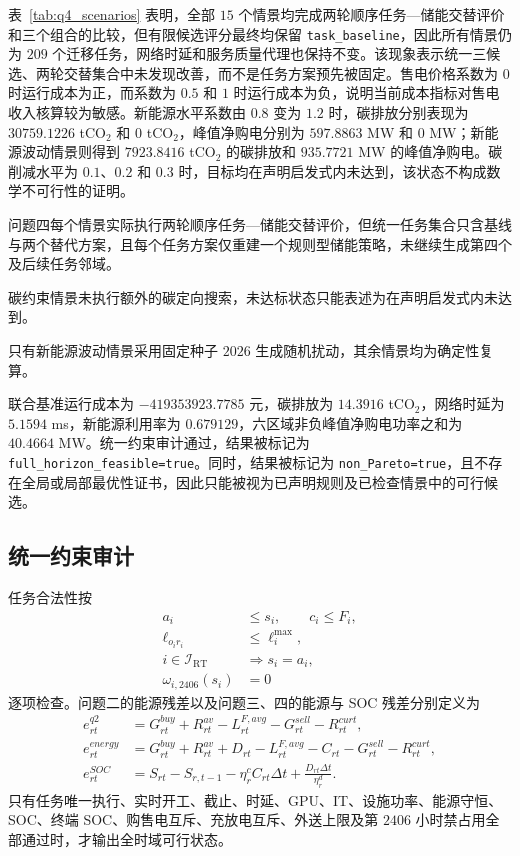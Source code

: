 表~\ref{tab:q4_scenarios} 表明，全部 $15$ 个情景均完成两轮顺序任务—储能交替评价和三个组合的比较，但有限候选评分最终均保留 \texttt{task\_baseline}，因此所有情景仍为 $209$ 个迁移任务，网络时延和服务质量代理也保持不变。该现象表示统一三候选、两轮交替集合中未发现改善，而不是任务方案预先被固定。售电价格系数为 $0$ 时运行成本为正，而系数为 $0.5$ 和 $1$ 时运行成本为负，说明当前成本指标对售电收入核算较为敏感。新能源水平系数由 $0.8$ 变为 $1.2$ 时，碳排放分别表现为 $30759.1226$ tCO$_2$ 和 $0$ tCO$_2$，峰值净购电分别为 $597.8863$ MW 和 $0$ MW；新能源波动情景则得到 $7923.8416$ tCO$_2$ 的碳排放和 $935.7721$ MW 的峰值净购电。碳削减水平为 $0.1$、$0.2$ 和 $0.3$ 时，目标均在声明启发式内未达到，该状态不构成数学不可行性的证明。

问题四每个情景实际执行两轮顺序任务—储能交替评价，但统一任务集合只含基线与两个替代方案，且每个任务方案仅重建一个规则型储能策略，未继续生成第四个及后续任务邻域。

碳约束情景未执行额外的碳定向搜索，未达标状态只能表述为在声明启发式内未达到。

只有新能源波动情景采用固定种子 $2026$ 生成随机扰动，其余情景均为确定性复算。

联合基准运行成本为 $-419353923.7785$ 元，碳排放为 $14.3916$ tCO$_2$，网络时延为 $5.1594$ ms，新能源利用率为 $0.679129$，六区域非负峰值净购电功率之和为 $40.4664$ MW。统一约束审计通过，结果被标记为 \texttt{full\_horizon\_feasible=true}。同时，结果被标记为 \texttt{non\_Pareto=true}，且不存在全局或局部最优性证书，因此只能被视为已声明规则及已检查情景中的可行候选。

\subsection{统一约束审计}

任务合法性按
\begin{align}
a_i&\le s_i,\qquad c_i\le F_i,\\
\ell_{o_ir_i}&\le\ell_i^{\max},\\
i\in\mathcal I_{\mathrm{RT}}&\Rightarrow s_i=a_i,\\
\omega_{i,2406}(s_i)&=0
\end{align}
逐项检查。问题二的能源残差以及问题三、四的能源与 SOC 残差分别定义为
\begin{align}
e_{rt}^{q2}
&=G_{rt}^{buy}+R_{rt}^{av}
-L_{rt}^{F,avg}-G_{rt}^{sell}-R_{rt}^{curt},\\
e_{rt}^{energy}
&=G_{rt}^{buy}+R_{rt}^{av}+D_{rt}
-L_{rt}^{F,avg}-C_{rt}-G_{rt}^{sell}-R_{rt}^{curt},\\
e_{rt}^{SOC}
&=S_{rt}-S_{r,t-1}-\eta_r^cC_{rt}\Delta t
+\frac{D_{rt}\Delta t}{\eta_r^d}.
\end{align}
只有任务唯一执行、实时开工、截止、时延、GPU、IT、设施功率、能源守恒、SOC、终端 SOC、购售电互斥、充放电互斥、外送上限及第 $2406$ 小时禁占用全部通过时，才输出全时域可行状态。

